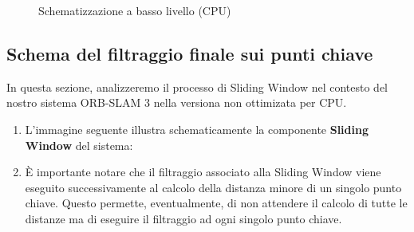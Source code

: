 \documentclass[12pt,a4paper]{report}
\begin{document}
\begin{figure}[H]
    \centering
    \caption{Schematizzazione a basso livello (CPU) }
\end{figure}

\subsection{Schema del filtraggio finale sui punti chiave} \label{filtraggio-finale}

In questa sezione, analizzeremo il processo di Sliding Window nel contesto del nostro sistema ORB-SLAM 3 nella versiona non ottimizata per CPU. 

\begin{enumerate}
    \item L'immagine seguente illustra schematicamente la componente \textbf{Sliding Window} del sistema:
    
    \item È importante notare che il filtraggio associato alla Sliding Window viene eseguito successivamente al calcolo della distanza minore di un singolo punto chiave. Questo permette, eventualmente, di non attendere il calcolo di tutte le distanze ma di eseguire il filtraggio ad ogni singolo punto chiave.
\end{enumerate}
\end{document}
